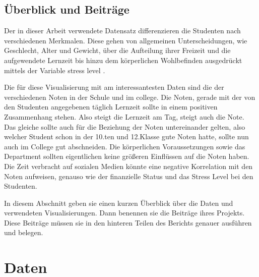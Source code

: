 \documentclass[usegeometry=true]{scrartcl}
\begin{document}
\subsection{Überblick und Beiträge}
Der in dieser Arbeit verwendete Datensatz differenzieren die Studenten nach verschiedenen Merkmalen. Diese gehen von allgemeinen Unterscheidungen, wie Geschlecht, Alter und Gewicht, über die Aufteilung ihrer Freizeit und die aufgewendete Lernzeit bis hinzu dem körperlichen Wohlbefinden ausgedrückt mittels der Variable \glq stress level \grq .



\noindent Die für diese Visualisierung mit am interessantesten Daten sind die der verschiedenen Noten in der Schule und im college. Die Noten, gerade mit der von den Studenten angegebenen täglich Lernzeit sollte in einem positiven Zusammenhang stehen. Also steigt die Lernzeit am Tag, steigt auch die Note. Das gleiche sollte auch für die Beziehung der Noten untereinander gelten, also welcher Student schon in der 10.ten und 12.Klasse gute Noten hatte, sollte nun auch im College gut abschneiden. 
\noindent Die körperlichen Voraussetzungen sowie das Department sollten eigentlichen keine größeren Einflüssen auf die Noten haben.
\noindent Die Zeit verbracht auf sozialen Medien könnte eine negative Korrelation mit den Noten aufweisen, genauso wie der finanzielle Status und das Stress Level bei den Studenten.

In diesem Abschnitt geben sie einen kurzen Überblick über die Daten und verwendeten Visualisierungen. Dann benennen sie die Beiträge ihres Projekts. Diese Beiträge müssen sie in den hinteren Teilen des Berichts genauer ausführen und belegen.

\section{Daten}
\end{document}
